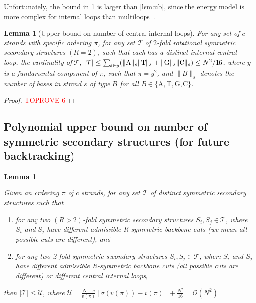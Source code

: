 \documentclass[11pt,letterpaper]{article}  \usepackage[margin=1in]{geometry}
\newtheorem{lemma}[theorem]{Lemma}
\theoremstyle{definition}  \newtheorem{Definition}[theorem]{Definition}
\begin{document}
Unfortunately, the bound in \cref{lem:ub2} is larger than \cref{lem:ub}, since the energy model is more complex for internal loops than multiloops~\cite{dirks2003partition}. 

\begin{lemma}[Upper bound on number of  central internal loops]\label{lem:ub2}
	For any set of $c$ strands with specific ordering $\pi$, for any set $\mathcal{T}$ of $2$-fold rotational symmetric secondary structures $(R=2)$, 
	such that each has a distinct internal central loop, the  cardinality of $\mathcal{T}$, $ |\mathcal{T}| \leq \sum_{s\in y} (\lVert \mathrm{A} \rVert_s \lVert \mathrm{T} \rVert_s+ \lVert \mathrm{G} \rVert_s \lVert \mathrm{C} \rVert_s ) \leq N^2/16$, 
	where $y$ is a fundamental component of $\pi$, such that $\pi = y^2$, and $\parallel\! \! B \!\! \parallel_s$  
	denotes the number of bases in strand $s$ of type $B$ for all $B\in\{\mathrm{A},\mathrm{T},\mathrm{G},\mathrm{C}\}$.
\end{lemma} 

\begin{proof}\textcolor{red}{TOPROVE 6}\end{proof}









\subsection{Polynomial upper bound on number of symmetric secondary structures (for future backtracking)}
\begin{lemma}\label{lem:polyub}
	
	Given an ordering $\pi$ of $c$ strands, 
	for any set $\mathcal{T}$ of distinct symmetric secondary structures such that 
	\begin{enumerate}
		\item  for any two $(R>2)$-fold symmetric secondary structures $S_i, S_j \in \mathcal{T}$, where $S_i$ and $S_j$ have different admissible R-symmetric backbone cuts (we mean all possible cuts are different), 	
		and 
		\item 
		for any two 2-fold symmetric secondary structures $S_i, S_j \in \mathcal{T}$, where $S_i$ and $S_j$ have different admissible R-symmetric backbone cuts (all possible cuts are different)
		or  different central internal loops, 
	\end{enumerate}
	then $|\mathcal{T}| \leq \mathcal{U}$, where $\mathcal{U} =  \frac{N-c}{v(\pi)} \left[ \sigma(v(\pi))-v(\pi) \right] + \frac{N^2}{16} = \mathcal{O}(N^2)$. 
\end{lemma}
\end{document}
